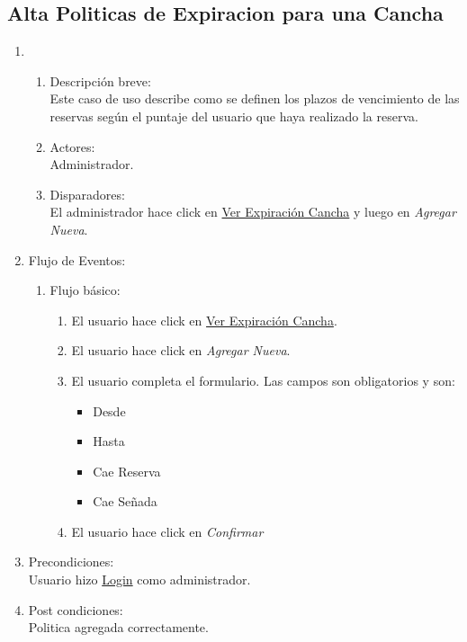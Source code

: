 \documentclass[a4paper,11pt]{article}
\begin{document}
\subsection{Alta Politicas de Expiracion para una Cancha} 
\begin{enumerate}
    \item
    \begin{enumerate}
    \item Descripci\'on breve: \\
        Este caso de uso describe como se definen los plazos de vencimiento de
        las reservas seg\'un el puntaje del usuario que haya realizado la reserva.
    \item Actores: \\
        Administrador.
    \item Disparadores: \\
        El administrador hace click en \underline{Ver Expiraci\'on Cancha} y luego en \emph{Agregar Nueva}.
    \end{enumerate}
    \item Flujo de Eventos: 
    \begin{enumerate}
        \item Flujo b\'asico:
		\begin{enumerate}
            		\item El usuario hace click en \underline{Ver Expiraci\'on Cancha}.
            		\item El usuario hace click en \emph{Agregar Nueva}.
            		\item El usuario completa el formulario. Las campos son obligatorios y son:
            		\begin{itemize}
				\item Desde
				\item Hasta
				\item Cae Reserva
				\item Cae Se\~nada
			\end{itemize}
			\item El usuario hace click en \emph{Confirmar}
		\end{enumerate}
    \end{enumerate}
    \item Precondiciones: \\
        Usuario hizo \underline{Login} como administrador.
    \item Post condiciones: \\
        Politica agregada correctamente.
\end{enumerate}
\end{document}
